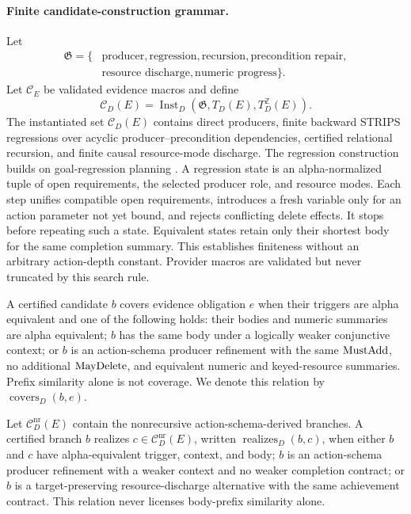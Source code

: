 \paragraph{Finite candidate-construction grammar.}
Let
\[
\begin{aligned}
\mathfrak G=\{&\text{producer},\text{regression},\text{recursion},
\text{precondition repair},\\
&\text{resource discharge},\text{numeric progress}\}.
\end{aligned}
\]
Let $\mathcal C_E$ be validated evidence macros and define
\[
\mathcal C_D(E)=
\operatorname{Inst}_D(\mathfrak G,T_D(E),T_D^{\mathbb Z}(E)).
\]
The instantiated set $\mathcal C_D(E)$ contains
direct producers, finite backward STRIPS regressions over acyclic
producer--precondition dependencies, certified relational recursion, and finite
causal resource-mode discharge. The regression construction builds on
goal-regression planning \cite{Fikes1972GeneralizedRobotPlans,Chen2026Moose}.
A regression state is an alpha-normalized tuple
of open requirements, the selected producer role, and resource modes. Each step
unifies compatible open requirements, introduces a fresh variable only for an
action parameter not yet bound, and rejects conflicting delete effects. It
stops before repeating such a state. Equivalent states retain only their
shortest body for the same completion summary. This establishes finiteness
without an arbitrary action-depth constant. Provider macros are validated but
never truncated by this search rule.

\begin{definition}
A certified candidate $b$ covers evidence obligation $e$ when their triggers are
alpha equivalent and one of the following holds: their bodies and numeric
summaries are alpha equivalent; $b$ has the same body under a logically weaker
conjunctive context; or $b$ is an action-schema producer refinement with the same
$\mathrm{MustAdd}$, no additional $\mathrm{MayDelete}$, and equivalent numeric and keyed-resource
summaries. Prefix similarity alone is not coverage.
We denote this relation by $\operatorname{covers}_D(b,e)$.
\end{definition}

\begin{definition}
Let $\mathcal C_D^{\mathrm{nr}}(E)$ contain the nonrecursive
action-schema-derived branches. A certified branch $b$ realizes
$c\in\mathcal C_D^{\mathrm{nr}}(E)$, written $\operatorname{realizes}_D(b,c)$, when
either $b$ and $c$ have alpha-equivalent trigger, context, and body; $b$ is an
action-schema producer refinement with a weaker context and no weaker
completion contract; or $b$ is a target-preserving resource-discharge
alternative with the same achievement contract. This relation never licenses
body-prefix similarity alone.
\end{definition}

